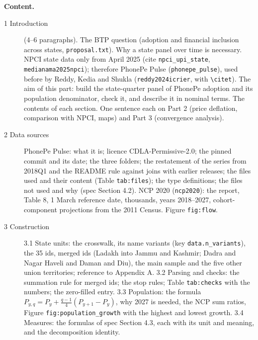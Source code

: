 \documentclass[10pt,a4paper]{article}
\newcommand{\f}[1]{\texttt{#1}}
\begin{document}
\textbf{Content.}
\begin{description}
\item[1 Introduction] (4--6 paragraphs). The BTP question (adoption and financial inclusion across states,
  \f{proposal.txt}). Why a state panel over time is necessary. NPCI state data only from April 2025
  (cite \f{npci\_upi\_state}, \f{medianama2025npci}); therefore PhonePe Pulse (\f{phonepe\_pulse}), used before by
  Reddy, Kedia and Shukla (\f{reddy2024icrier}, with \verb|\citet|). The aim of this part: build the state-quarter panel of PhonePe adoption and its
  population denominator, check it, and describe it in nominal terms. The contents of each section. One sentence
  each on Part 2 (price deflation, comparison with NPCI, maps) and Part 3 (convergence analysis).
\item[2 Data sources] PhonePe Pulse: what it is; licence CDLA-Permissive-2.0; the pinned commit and its date;
  the three folders; the restatement of the series from 2018Q1 and the README rule against joins with earlier
  releases; the files used and their content (Table \f{tab:files}); the type definitions; the files not used and
  why (spec Section 4.2). NCP 2020 (\f{ncp2020}): the report, Table 8, 1 March reference date, thousands,
  years 2018--2027, cohort-component projections from the 2011 Census. Figure \f{fig:flow}.
\item[3 Construction] 3.1 State units: the crosswalk, its name variants (key \f{data.n\_variants}), the 35 ids, merged ids
  (Ladakh into Jammu and Kashmir; Dadra and Nagar Haveli and Daman and Diu), the main sample and the five other
  union territories; reference to Appendix A. 3.2 Parsing and checks: the summation rule for merged ids; the
  stop rules; Table \f{tab:checks} with the numbers; the zero-filled entry. 3.3 Population: the formula
  $P_{y,q} = P_y + \frac{q-1}{4}(P_{y+1}-P_y)$, why 2027 is needed, the NCP sum ratios, Figure
  \f{fig:population\_growth} with the highest and lowest growth. 3.4 Measures: the formulas of spec Section 4.3,
  each with its unit and meaning, and the decomposition identity.
\end{description}
\end{document}
